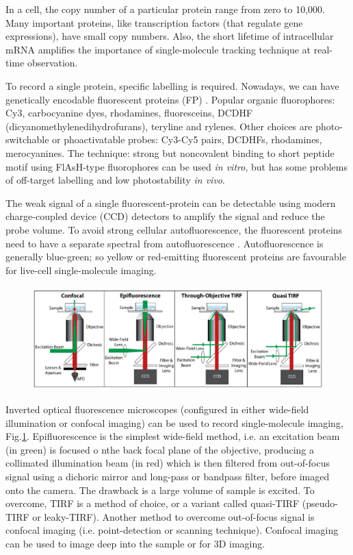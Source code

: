 In a cell, the copy number of a particular protein range from zero to 10,000.
Many important proteins, like transcription factors (that regulate gene
expressions), have small copy numbers. Also, the short lifetime of intracellular
mRNA amplifies the importance of single-molecule tracking technique at real-time
observation. 

To record a single protein, specific labelling is required. Nowadays, we can
have genetically encodable fluorescent proteins (FP) \citep{giepmans2006}.
Popular organic fluorophores:
Cy3, carbocyanine dyes, rhodamines, fluoresceins, DCDHF
(dicyanomethylenedihydrofurans), teryline and rylenes. Other choices are
photo-switchable or phoactivatable probes: Cy3-Cy5 pairs, DCDHFs, rhodamines,
merocyanines.  The technique: strong but noncovalent binding to short peptide
motif using FlAsH-type fluorophores can be used {\it in vitro}, but has some
problems of off-target labelling and low photostability {\it in vivo}.

The weak signal of a single fluorescent-protein can be detectable
using modern charge-coupled device (CCD) detectors to amplify the signal and
reduce the probe volume. To avoid strong cellular autofluorescence, the
fluorescent proteins need to have a separate spectral from autofluorescence
\citep{andersson1998}.  Autofluorescence is generally blue-green; so yellow or
red-emitting fluorescent proteins are favourable for live-cell single-molecule
imaging.


\begin{figure}[hbt]
  \centerline{\includegraphics[height=4cm,
    angle=0]{./images/imaging_techniques.eps}}
\caption{}
\label{fig:imaging_techniques}
\end{figure}

Inverted optical fluorescence microscopes (configured in either wide-field
illumination or confocal imaging) can be used to record single-molecule imaging,
Fig.\ref{fig:imaging_techniques}. Epifluorescence is the simplest wide-field
method, i.e. an excitation beam (in green) is focused o nthe back focal plane of
the objective, producing a collimated illumination beam (in red) which is then
filtered from out-of-focus signal using a dichoric mirror and long-pass or
bandpass filter, before imaged onto the camera. The drawback is a large volume
of sample is excited. To overcome, TIRF is a method of choice, or a variant
called quasi-TIRF (pseudo-TIRF or leaky-TIRF). Another method to overcome
out-of-focus signal is confocal imaging (i.e. point-detection or scanning
technique). Confocal imaging can be used to image deep into the sample or for 3D
imaging. 

